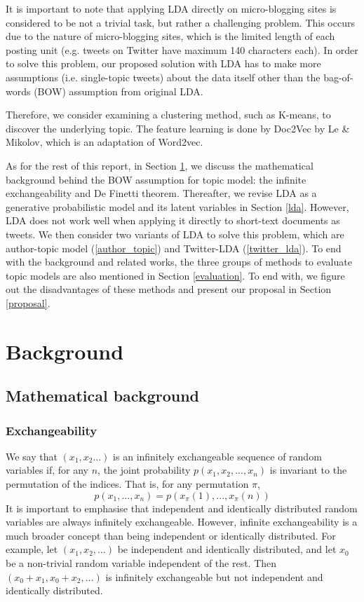 \documentclass[11pt]{article}
\begin{document}
It is important to note that applying LDA directly on micro-blogging sites is considered to be not a trivial task, but rather a challenging problem. This occurs due to the nature of micro-blogging sites, which is the limited length of each posting unit (e.g. tweets on Twitter have maximum 140 characters each). In order to solve this problem, our proposed solution with LDA has to make more assumptions (i.e. single-topic tweets) \cite{zhao2011comparing} about the data itself other than the bag-of-words (BOW) assumption from original LDA.

Therefore, we consider examining a clustering method, such as K-means, to discover the underlying topic. The feature learning is done by Doc2Vec by Le \& Mikolov\cite{le2014distributed}, which is an adaptation of Word2vec\cite{mikolov2013distributed}.

As for the rest of this report, in Section \ref{background}, we discuss the mathematical background behind the BOW assumption for topic model: the infinite exchangeability and De Finetti theorem. Thereafter, we revise LDA as a generative probabilistic model and its latent variables in Section \ref{lda}. However, LDA does not work well when applying it directly to short-text documents as tweets. We then consider two variants of LDA to solve this problem, which are author-topic model (\ref{author_topic}) and Twitter-LDA (\ref{twitter_lda}). To end with the background and related works, the three groups of methods to evaluate topic models are also mentioned in Section \ref{evaluation}. To end with, we figure out the disadvantages of these methods and present our proposal in Section \ref{proposal}.



\section{Background} \label{background}


\subsection{Mathematical background} \label{math}

\subsubsection{Exchangeability}

We say that $(x_1,x_2...)$ is an infinitely exchangeable sequence of random variables if, for any $n$, the joint probability $p(x_1,x_2,...,x_n)$ is invariant to the permutation of the indices. That is, for any permutation $\pi$,
\[p(x_1,...,x_n) = p(x_\pi(1),...,x_\pi(n))\]
It is important to emphasise that independent and identically distributed random variables are always infinitely exchangeable. However, infinite exchangeability is a much broader concept than being independent or identically distributed. For example, let $(x_1,x_2,\dots)$ be independent and identically distributed, and let $x_0$ be a non-trivial random variable independent of the rest. Then $(x_0+x_1,x_0+x_2,\dots)$ is infinitely exchangeable but not independent and identically distributed.
\end{document}
